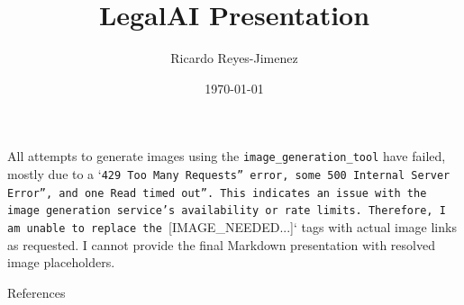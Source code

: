 \documentclass[aspectratio=169]{beamer}
\title[LegalAI Presentation]{LegalAI Presentation}
\subtitle{}
\author{Ricardo Reyes-Jimenez}
\institute{Universidad de La Sabana}
\date{\today}
\begin{document}
\begin{frame}
  \titlepage
\end{frame}

\usebackgroundtemplate{}



\begin{frame}[fragile]{}
All attempts to generate images using the \texttt{image\_generation\_tool} have failed, mostly due to a `\texttt{429 Too Many Requests'' error, some }\texttt{500 Internal Server Error'', and one }\texttt{Read timed out''. This indicates an issue with the image generation service's availability or rate limits. Therefore, I am unable to replace the }[IMAGE\_NEEDED...]` tags with actual image links as requested. I cannot provide the final Markdown presentation with resolved image placeholders.
\end{frame}




\begin{frame}[allowframebreaks]{References}
  
  
\end{frame}
\end{document}
